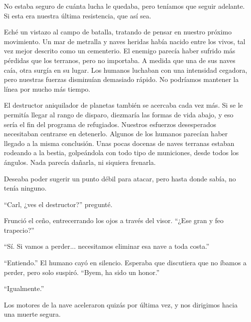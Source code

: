 No estaba seguro de cuánta lucha le quedaba, pero teníamos que seguir adelante. Si esta era nuestra última resistencia, que así sea.

Eché un vistazo al campo de batalla, tratando de pensar en nuestro próximo movimiento. Un mar de metralla y naves heridas había nacido entre los vivos, tal vez mejor descrito como un cementerio. El enemigo parecía haber sufrido más pérdidas que los terranos, pero no importaba. A medida que una de sus naves caía, otra surgía en su lugar. Los humanos luchaban con una intensidad cegadora, pero nuestras fuerzas disminuían demasiado rápido. No podríamos mantener la línea por mucho más tiempo.

El destructor aniquilador de planetas también se acercaba cada vez más. Si se le permitía llegar al rango de disparo, diezmaría las formas de vida abajo, y eso sería el fin del programa de refugiados. Nuestros esfuerzos desesperados necesitaban centrarse en detenerlo. Algunos de los humanos parecían haber llegado a la misma conclusión. Unas pocas docenas de naves terranas estaban rodeando a la bestia, golpeándola con todo tipo de municiones, desde todos los ángulos. Nada parecía dañarla, ni siquiera frenarla.

Deseaba poder sugerir un punto débil para atacar, pero hasta donde sabía, no tenía ninguno.

“Carl, ¿ves el destructor?” pregunté.

Frunció el ceño, entrecerrando los ojos a través del visor. “¿Ese gran y feo trapecio?”

“Sí. Si vamos a perder... necesitamos eliminar esa nave a toda costa.”

“Entiendo.” El humano cayó en silencio. Esperaba que discutiera que no íbamos a perder, pero solo suspiró. “Byem, ha sido un honor.”

“Igualmente.”

Los motores de la nave aceleraron quizás por última vez, y nos dirigimos hacia una muerte segura.